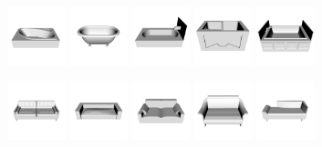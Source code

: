 \begin{figure}[!hbt]
	\includegraphics[width=0.15\textwidth]{Figures/ObjRecog/bathtub_0}\hfill
	\includegraphics[width=0.15\textwidth]{Figures/ObjRecog/bathtub_1}\hfill
	\includegraphics[width=0.15\textwidth]{Figures/ObjRecog/bathtub_2}\hfill
	\includegraphics[width=0.15\textwidth]{Figures/ObjRecog/bathtub_3}\hfill
	\includegraphics[width=0.15\textwidth]{Figures/ObjRecog/bathtub_4}\hfill

	\includegraphics[width=0.15\textwidth]{Figures/ObjRecog/sofa_0}\hfill
	\includegraphics[width=0.15\textwidth]{Figures/ObjRecog/sofa_1}\hfill
	\includegraphics[width=0.15\textwidth]{Figures/ObjRecog/sofa_2}\hfill
	\includegraphics[width=0.15\textwidth]{Figures/ObjRecog/sofa_3}\hfill
	\includegraphics[width=0.15\textwidth]{Figures/ObjRecog/sofa_4}\hfill


\end{figure}
